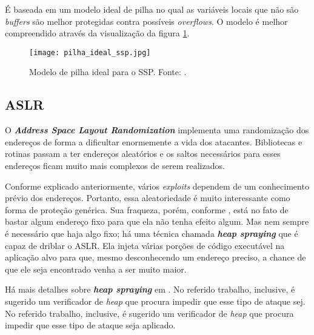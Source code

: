 			
			É baseada em um modelo ideal de pilha no qual as variáveis locais que não
			são \textsl{buffers} são melhor protegidas contra possíveis \textsl{overflows}.
			O modelo é melhor compreendido através da visualização da figura \ref{fig:pilha_ideal_ssp}.

			\begin{figure}
				\begin{center}
					\texttt{[image: pilha\_ideal\_ssp.jpg]}
					\caption{Modelo de pilha ideal para o SSP. Fonte: \cite{Martins2009}.}
					\label{fig:pilha_ideal_ssp}
				\end{center}
			\end{figure}


		\subsection{ASLR}
			O \textsl{\textbf{Address Space Layout Randomization}} implementa uma randomização
			dos endereços de forma a dificultar enormemente a vida dos atacantes.
			Bibliotecas e rotinas passam a ter endereços aleatórios e os saltos necessários
			para esses endereços ficam muito mais complexos de serem realizados.

			
			Conforme explicado anteriormente, vários \textsl{exploits} dependem de um conhecimento
			prévio dos endereços. Portanto, essa aleatoriedade é muito interessante como
			forma de proteção genérica. Sua fraqueza, porém, conforme \cite{Anley2007}, está no fato
			de bastar algum endereço fixo para que ela não tenha efeito algum. Mas nem sempre é necessário
			que haja algo fixo; há uma técnica chamada \textsl{\textbf{heap spraying}} que é capaz
			de driblar o ASLR. Ela injeta várias porções de código executável na aplicação alvo
			para que, mesmo desconhecendo um endereço preciso, a chance de que ele seja encontrado
			venha a ser muito maior.

			
			Há mais detalhes sobre \textsl{\textbf{heap spraying}} em \cite{Nozzle}. No referido trabalho,
			inclusive, é sugerido um verificador de \textsl{heap} que procura impedir que esse tipo
			de ataque sej. No referido trabalho,
			inclusive, é sugerido um verificador de \textsl{heap} que procura impedir que esse tipo
			de ataque seja aplicado.
			
			
